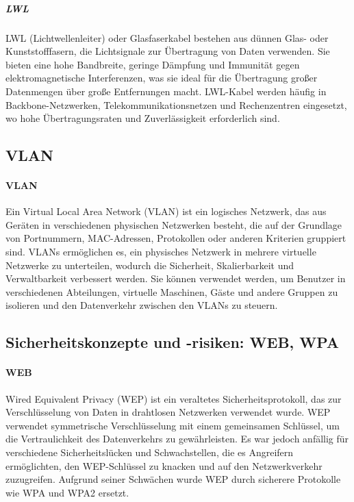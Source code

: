 \subparagraph{LWL}

LWL (Lichtwellenleiter) oder Glasfaserkabel bestehen aus dünnen Glas- oder Kunststofffasern, die Lichtsignale zur Übertragung von Daten verwenden. Sie bieten eine hohe Bandbreite, geringe Dämpfung und Immunität gegen elektromagnetische Interferenzen, was sie ideal für die Übertragung großer Datenmengen über große Entfernungen macht. LWL-Kabel werden häufig in Backbone-Netzwerken, Telekommunikationsnetzen und Rechenzentren eingesetzt, wo hohe Übertragungsraten und Zuverlässigkeit erforderlich sind.

\subsection{VLAN}

\paragraph{VLAN}

Ein Virtual Local Area Network (VLAN) ist ein logisches Netzwerk, das aus Geräten in verschiedenen physischen Netzwerken besteht, die auf der Grundlage von Portnummern, MAC-Adressen, Protokollen oder anderen Kriterien gruppiert sind. VLANs ermöglichen es, ein physisches Netzwerk in mehrere virtuelle Netzwerke zu unterteilen, wodurch die Sicherheit, Skalierbarkeit und Verwaltbarkeit verbessert werden. Sie können verwendet werden, um Benutzer in verschiedenen Abteilungen, virtuelle Maschinen, Gäste und andere Gruppen zu isolieren und den Datenverkehr zwischen den VLANs zu steuern.

\subsection{Sicherheitskonzepte und -risiken: WEB, WPA}

\paragraph{WEB}

Wired Equivalent Privacy (WEP) ist ein veraltetes Sicherheitsprotokoll, das zur Verschlüsselung von Daten in drahtlosen Netzwerken verwendet wurde. WEP verwendet symmetrische Verschlüsselung mit einem gemeinsamen Schlüssel, um die Vertraulichkeit des Datenverkehrs zu gewährleisten. Es war jedoch anfällig für verschiedene Sicherheitslücken und Schwachstellen, die es Angreifern ermöglichten, den WEP-Schlüssel zu knacken und auf den Netzwerkverkehr zuzugreifen. Aufgrund seiner Schwächen wurde WEP durch sicherere Protokolle wie WPA und WPA2 ersetzt.

